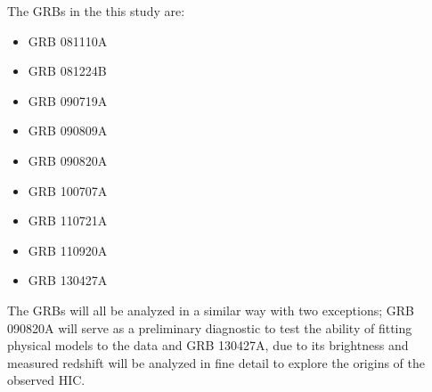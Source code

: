 The GRBs in the this study are:
\begin{itemize}
\item GRB 081110A
\item GRB 081224B
\item GRB 090719A
\item GRB 090809A
\item GRB 090820A
\item GRB 100707A
\item GRB 110721A
\item GRB 110920A
\item GRB 130427A
\end{itemize}
The GRBs will all be analyzed in a similar way with two exceptions;
GRB 090820A will serve as a preliminary diagnostic to test the ability
of fitting physical models to the data and GRB 130427A, due to its
brightness and measured redshift will be analyzed in fine detail to
explore the origins of the observed HIC.

